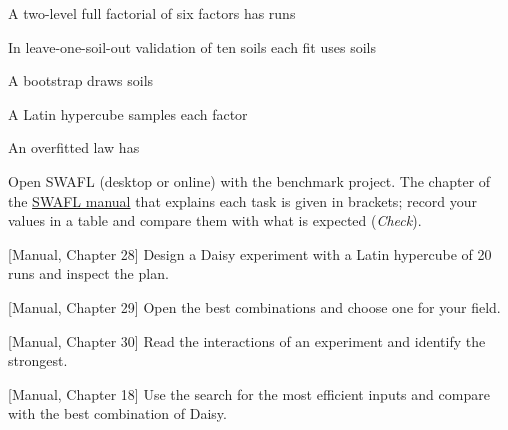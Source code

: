 \begin{exlist}
\item A two-level full factorial of six factors has runs
\item In leave-one-soil-out validation of ten soils each fit uses soils
\item A bootstrap draws soils
\item A Latin hypercube samples each factor
\item An overfitted law has
\end{exlist}
{\small Open SWAFL (desktop or online) with the benchmark project. The chapter of the \href{https://github.com/halilunaziru73-creator/Coupled-Water-Fluxes-Pore-Scale-Dynamics-Precision-Irrigation-Mulching-Feedback-Loops/raw/main/Software/v1.1.0/SWAFL_Desktop/docs/manual_v1.1.0/SWAFL_Manual_v1.1.0.pdf}{SWAFL manual} that explains each task is given in brackets; record your values in a table and compare them with what is expected (\emph{Check}).}\par\vspace{3pt}
\begin{exlist}
\item {\color{khblue}[Manual, Chapter 28]} Design a Daisy experiment with a Latin hypercube of 20 runs and inspect the plan.\par{}
\item {\color{khblue}[Manual, Chapter 29]} Open the best combinations and choose one for your field.\par{}
\item {\color{khblue}[Manual, Chapter 30]} Read the interactions of an experiment and identify the strongest.\par{}
\item {\color{khblue}[Manual, Chapter 18]} Use the search for the most efficient inputs and compare with the best combination of Daisy.\par{}
\end{exlist}

